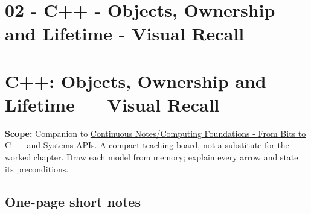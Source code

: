 \hypertarget{appendix-960160274237}{}
\section*{02 - C++ - Objects, Ownership and Lifetime - Visual Recall}
\section{C++: Objects, Ownership and Lifetime --- Visual Recall}\label{c-objects-ownership-and-lifetime-visual-recall}

\textbf{Scope:} Companion to \href{Continuous\%20Notes/Computing\%20Foundations\%20-\%20From\%20Bits\%20to\%20C++\%20and\%20Systems\%20APIs}{Continuous Notes/Computing Foundations - From Bits to C++ and Systems APIs}. A compact teaching board, not a substitute for the worked chapter. Draw each model from memory; explain every arrow and state its preconditions.

\subsection{One-page short notes}\label{one-page-short-notes}

